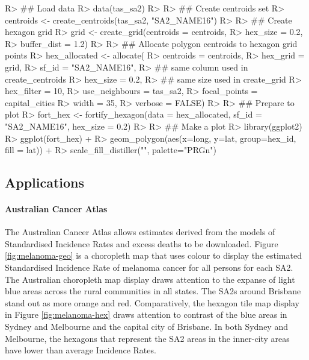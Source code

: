 \documentclass[
]{jss}
\begin{document}
\begin{CodeChunk}

\begin{CodeInput}
R> ## Load data
R> data(tas_sa2)
R> 
R> ## Create centroids set
R> centroids <- create_centroids(tas_sa2, "SA2_NAME16")
R> 
R> ## Create hexagon grid
R> grid <- create_grid(centroids = centroids,
R>     hex_size = 0.2,
R>     buffer_dist = 1.2)
R> 
R> ## Allocate polygon centroids to hexagon grid points
R> hex_allocated <- allocate(
R>   centroids = centroids,
R>   hex_grid = grid,
R>   sf_id = "SA2_NAME16",
R>   ## same column used in create_centroids
R>   hex_size = 0.2,
R>   ## same size used in create_grid
R>   hex_filter = 10,
R>   use_neighbours = tas_sa2,
R>   focal_points = capital_cities %
R>   width = 35,
R>   verbose = FALSE)
R> 
R> ## Prepare to plot
R> fort_hex <- fortify_hexagon(data = hex_allocated, sf_id = "SA2_NAME16", hex_size = 0.2)
R> 
R> ## Make a plot
R> library(ggplot2)
R> ggplot(fort_hex) + 
R>   geom_polygon(aes(x=long, y=lat, group=hex_id, fill = lat)) +
R>   scale_fill_distiller("", palette="PRGn")
\end{CodeInput}
\end{CodeChunk}

\hypertarget{applications}{%
\subsection{Applications}\label{applications}}

\hypertarget{australian-cancer-atlas}{%
\paragraph{Australian Cancer Atlas}\label{australian-cancer-atlas}}

The Australian Cancer Atlas \citep{TACA} allows estimates derived from
the models of Standardised Incidence Rates and excess deaths to be
downloaded. Figure \ref{fig:melanoma-geo} is a choropleth map that uses
colour to display the estimated Standardised Incidence Rate of melanoma
cancer for all persons for each SA2. The Australian choropleth map
display draws attention to the expanse of light blue areas across the
rural communities in all states. The SA2s around Brisbane stand out as
more orange and red. Comparatively, the hexagon tile map display in
Figure \ref{fig:melanoma-hex} draws attention to contrast of the blue
areas in Sydney and Melbourne and the capital city of Brisbane. In both
Sydney and Melbourne, the hexagons that represent the SA2 areas in the
inner-city areas have lower than average Incidence Rates.
\end{document}
